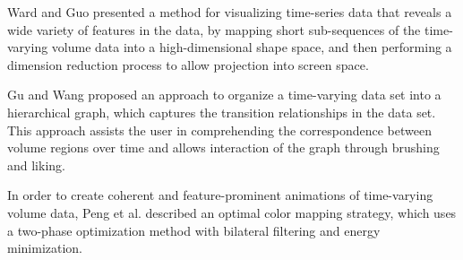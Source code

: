 \documentclass{egpubl}
\begin{document}
Ward and Guo \cite{ward_visual_2011} presented a method for visualizing time-series data that reveals a wide variety of features in the data, by mapping short sub-sequences of the time-varying volume data into a high-dimensional shape space, and then performing a dimension reduction process to allow projection into screen space.

Gu and Wang \cite{gu_transgraph:_2011} proposed an approach to organize a time-varying data set into a hierarchical graph, which captures the transition relationships in the data set. This approach assists the user in comprehending the correspondence between volume regions over time and allows interaction of the graph through brushing and liking.

In order to create coherent and feature-prominent animations of time-varying volume data, Peng et al. \cite{peng_optimal_2011} described an optimal color mapping strategy, which uses a two-phase optimization method with bilateral filtering and energy minimization.




	
%

	

	
	
\end{document}
